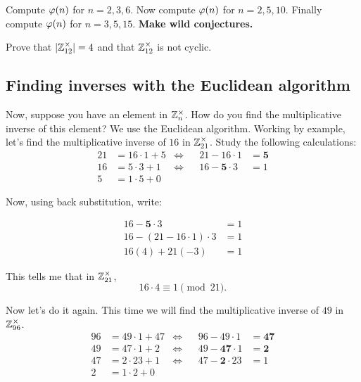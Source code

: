 \documentclass{ximera}
\begin{document}
\begin{exercise}
  Compute $\eulerphi(n)$ for $n = 2,3,6$. Now compute $\eulerphi(n)$
  for $n = 2,5,10$. Finally compute $\eulerphi(n)$ for $n=
  3,5,15$. \textbf{Make wild conjectures.}
\end{exercise}


\begin{exercise}
  Prove that $|\mathbb Z^\times_{12}| = 4$ and that $\mathbb Z^\times_{12}$ is not
  cyclic.
\end{exercise}








\subsection{Finding inverses with the Euclidean algorithm}



Now, suppose you have an element in $\mathbb Z_n^\times$. How do you find the
multiplicative inverse of this element? We use the Euclidean
algorithm. Working by example, let's find
the multiplicative inverse of $16$ in $\mathbb Z_{21}^\times$. Study
the following calculations:
\begin{align*}
  21 &= 16\cdot 1 + 5 &\Leftrightarrow & &                21-16\cdot 1 &= \boldsymbol{5}\\ 
  16 &= 5\cdot 3 + 1 &\Leftrightarrow  & &   16 - \boldsymbol{5}\cdot 3 &= 1\\ 
  5 &= 1 \cdot 5 + 0 &  & & &
\end{align*}

Now, using back substitution, write:

\begin{align*}
16 - \boldsymbol{5}\cdot 3 &= 1 \\
16 - (21-16\cdot 1)\cdot 3 &= 1 \\
16(4) + 21(-3) &= 1
\end{align*}

This tells me that in $\mathbb Z_{21}^\times$,
\[
16\cdot 4 \equiv 1 \pmod{21}.
\]


Now let's do it again. This time we will find the multiplicative
inverse of $49$ in $\mathbb Z_{96}^\times$.
\begin{align*}
  96 &= 49\cdot 1 + 47 &\Leftrightarrow  & &                96 - 49\cdot 1 &= \boldsymbol{47}\\ 
  49 &= 47\cdot 1 + 2  &\Leftrightarrow  & &   49 - \boldsymbol{47}\cdot 1 &= \boldsymbol{2}\\ 
  47 &= 2 \cdot 23 + 1 &\Leftrightarrow  & &   47 - \boldsymbol{2}\cdot 23 &= 1 \\
  2 &= 1\cdot  2+ 0 & & & & 
\end{align*}
\end{document}
